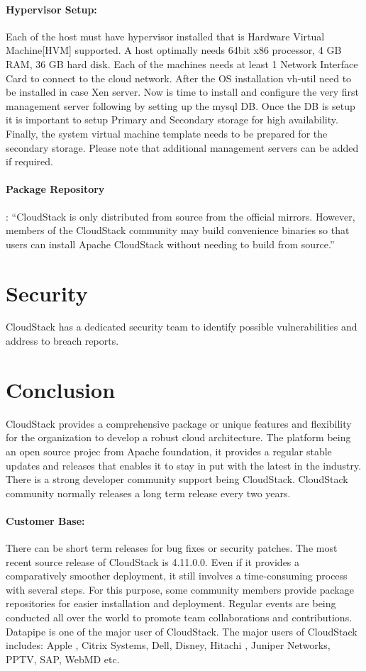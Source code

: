 \paragraph {Hypervisor Setup:} Each of the host must have hypervisor installed that is Hardware
Virtual Machine[HVM] supported. A host optimally needs 64bit x86 processor, 4 GB
RAM, 36 GB hard disk. Each of the machines needs at least 1 Network Interface Card 
to connect to the cloud network.  After the OS installation vh-util need to be installed 
in case Xen server. Now is time to install and configure the very first management 
server following by setting up the mysql DB. Once the DB is setup it is important to 
setup Primary and Secondary storage for high availability. Finally, the system virtual 
machine template needs to be prepared for the secondary storage. Please note
 that additional management servers can be added if required.

\paragraph {Package Repository}: ``CloudStack is only distributed from source from the official
mirrors. However, members of the CloudStack community may build convenience binaries 
so that users can install Apache CloudStack without needing to build from source.''~\cite{hid-sp18-417-www-cloudstack-package-repo}


\section{Security}
CloudStack has a dedicated security team to identify possible vulnerabilities and address to breach reports. 

\section{Conclusion}

CloudStack provides a comprehensive package or unique features and flexibility for the 
organization to develop a robust cloud architecture. The platform being an open source projec
from Apache foundation, it provides a regular stable updates and releases that enables it to 
stay in put with the latest in the industry. There is a strong developer community support
being CloudStack. CloudStack community normally releases a long term release every two years.

\paragraph {Customer Base:} There can be short term releases for bug fixes or security patches.
The most recent source release of CloudStack is 4.11.0.0. Even if it provides a comparatively smoother deployment,
it still involves a time-consuming process with several steps. For this purpose, some community 
members provide package repositories for easier installation and deployment. 
Regular events are being conducted all over the world to promote team collaborations and 
contributions. Datapipe is one of the major user of CloudStack. The major users of CloudStack
includes: Apple , Citrix Systems, Dell, Disney, Hitachi , Juniper Networks, PPTV, SAP, 
WebMD etc. 


